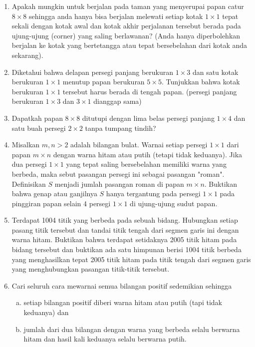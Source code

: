 \documentclass[11pt]{scrartcl}
\begin{document}
\begin{enumerate}[resume]
\item
    Apakah mungkin untuk berjalan pada taman yang menyerupai papan catur $8 \times 8$ sehingga anda hanya bisa berjalan melewati setiap kotak $1 \times 1$ tepat sekali dengan kotak awal dan kotak akhir perjalanan tersebut berada pada ujung-ujung (corner) yang saling berlawanan? (Anda hanya diperbolehkan berjalan ke kotak yang bertetangga atau tepat bersebelahan dari kotak anda sekarang).


\item
    Diketahui bahwa delapan persegi panjang berukuran $1 \times 3$ dan satu kotak berukuran $1 \times 1$ menutup papan berukuran $5 \times 5$. Tunjukkan bahwa kotak berukuran $1 \times 1$ tersebut harus berada di tengah papan. (persegi panjang berukuran $1 \times 3$ dan $3 \times 1$ dianggap sama)


\item
    Dapatkah papan $8\times8$ ditutupi dengan lima belas persegi panjang $1\times4$ dan satu buah persegi $2\times2$ tanpa tumpang tindih?


\item
    Misalkan $m,n > 2$ adalah bilangan bulat. Warnai setiap persegi $1\times1$ dari papan $m\times n$ dengan warna hitam atau putih (tetapi tidak keduanya). Jika dua persegi $1\times1$ yang tepat saling bersebelahan memiliki warna yang berbeda, maka sebut pasangan persegi ini sebagai pasangan "roman". Definisikan $S$ menjadi jumlah pasangan roman di papan $m\times n$. Buktikan bahwa genap atau ganjilnya $S$ hanya tergantung pada persegi $1\times1$ pada pinggiran papan selain 4 persegi $1\times1$ di ujung-ujung sudut papan.


\item
    Terdapat 1004 titik yang berbeda pada sebuah bidang. Hubungkan setiap pasang titik tersebut dan tandai titik tengah dari segmen garis ini dengan warna hitam. Buktikan bahwa terdapat setidaknya 2005 titik hitam pada bidang tersebut dan buktikan ada satu himpunan berisi 1004 titik berbeda yang menghasilkan tepat 2005 titik hitam pada titik tengah dari segmen garis yang menghubungkan pasangan titik-titik tersebut.


\item
    Cari seluruh cara mewarnai semua bilangan positif sedemikian sehingga 
    \begin{enumerate}[(a)]
        \item setiap bilangan positif diberi warna hitam atau putih (tapi tidak keduanya) dan \item jumlah dari dua bilangan dengan warna yang berbeda selalu berwarna hitam dan hasil kali keduanya selalu berwarna putih.
    \end{enumerate}
     

\end{enumerate}
\end{document}
